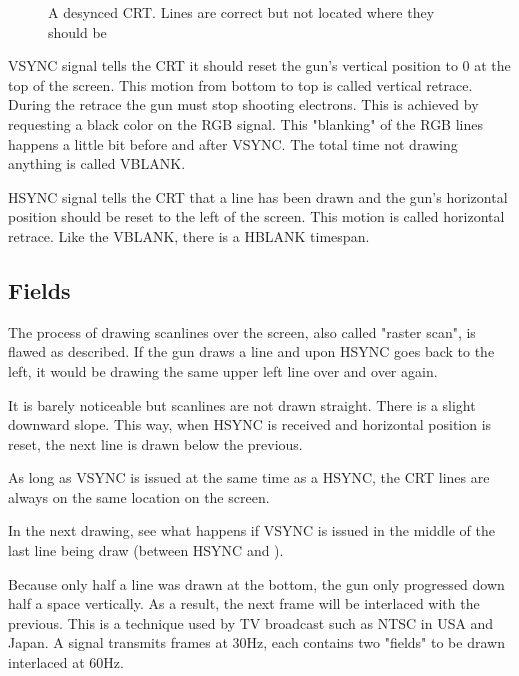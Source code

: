 \begin{figure}[H]
\caption*{A desynced CRT. Lines are correct but not located where they should be}
\end{figure}





VSYNC signal tells the CRT it should reset the gun's vertical position to 0 at the top of the screen. This motion from bottom to top is called vertical retrace. During the retrace the gun must stop shooting electrons. This is achieved by requesting a black color on the RGB signal. This "blanking" of the RGB lines happens a little bit before and after VSYNC. The total time not drawing anything is called VBLANK.

HSYNC signal tells the CRT that a line has been drawn and the gun's horizontal position should be reset to the left of the screen. This motion is called horizontal retrace. Like the VBLANK, there is a HBLANK timespan. 

\pagebreak
\subsection{Fields}

The process of drawing scanlines over the screen, also called "raster scan", is flawed as described. If the gun draws a line and upon HSYNC goes back to the left, it would be drawing the same upper left line over and over again. 

It is barely noticeable but scanlines are not drawn straight. There is a slight downward slope. This way, when HSYNC is received and horizontal position is reset, the next line is drawn below the previous.




As long as VSYNC is issued at the same time as a HSYNC, the CRT lines are always on the same location on the screen.

In the next drawing, see what happens if VSYNC  is issued in the middle of the last line being draw (between HSYNC  and ).


Because only half a line was drawn at the bottom, the gun only progressed down half a space vertically. As a result, the next frame will be interlaced with the previous. This is a technique used by TV broadcast such as NTSC in USA and Japan. A signal transmits frames at 30Hz, each contains two "fields" to be drawn interlaced at 60Hz.

